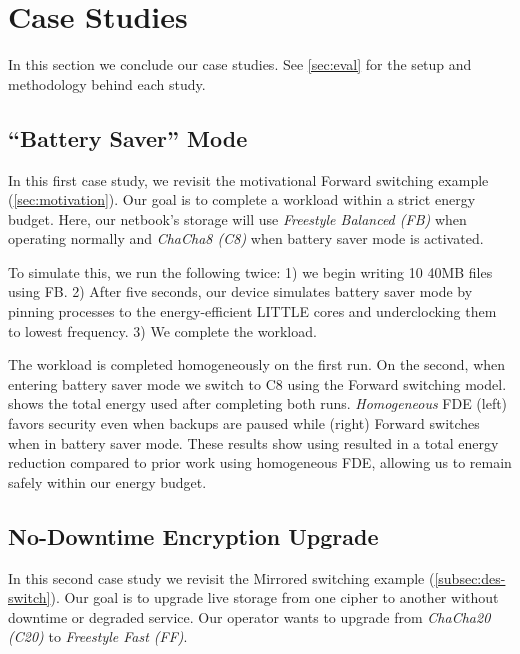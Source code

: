 \section{Case Studies}\label{sec:usecases}

In this section we conclude our case studies. See \cref{sec:eval} for the setup
and methodology behind each study.


\subsection{``Battery Saver'' Mode}\label{subsec:usecase-battery}

In this first case study, we revisit the motivational Forward switching example
(\cref{sec:motivation}). Our goal is to complete a workload within a strict
energy budget. Here, our netbook's storage will use {\em Freestyle Balanced (FB)}
when operating normally and {\em ChaCha8 (C8)} when battery saver mode is
activated.



To simulate this, we run the following twice: 1) we begin writing 10 40MB
files using FB. 2) After five seconds, our device simulates battery saver mode
by pinning \sys processes to the energy-efficient LITTLE cores and underclocking
them to lowest frequency. 3) We complete the workload.

The workload is completed homogeneously on the first run. On the second, when
entering battery saver mode we switch to C8 using the Forward switching model.
 shows the total energy used after completing both
runs. {\em Homogeneous} FDE (left) favors security even when backups are paused
while \sys (right) Forward switches when in battery saver mode. These results
show using \sys resulted in a  total energy reduction compared to
prior work using homogeneous FDE, allowing us to remain safely within our energy
budget.


\subsection{No-Downtime Encryption Upgrade}\label{subsec:usecase-upgrade}

In this second case study we revisit the Mirrored switching example
(\cref{subsec:des-switch}). Our goal is to upgrade live storage from one cipher
to another without downtime or degraded service. Our operator wants to upgrade
from {\em ChaCha20 (C20)} to {\em Freestyle Fast (FF)}.

